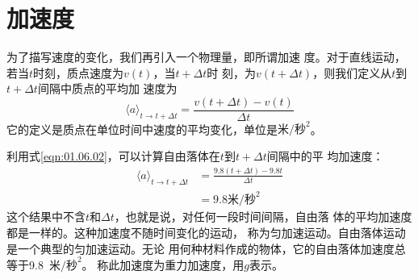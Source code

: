 \section{加速度}\label{sec:01.08}

为了描写速度的变化，我们再引入一个物理量，即所谓加速
度。对于直线运动，若当$t$时刻，质点速度为$v(t)$，$当t+\Delta t$时
刻，为$v(t+\Delta t)$，则我们定义从$t$到$t+\Delta t$间隔中质点的平均加
速度为
\vspace{-1em}\begin{equation}\label{eqn:01.08.01}
    \langle a\rangle_{t\rightarrow t+\Delta t} = \frac{v(t+\Delta t)-v(t)}{\Delta t}
\end{equation}
它的定义是质点在单位时间中速度的平均变化，单位是$\text{米/秒}^2$。

利用式\eqref{eqn:01.06.02}，可以计算自由落体在$t$到$t+\Delta t$间隔中的平
均加速度：
\vspace{-0.5em}\begin{equation*}
    \begin{aligned}
        \langle a\rangle_{t\rightarrow t+\Delta t} & = \frac{9.8(t+\Delta t)-9.8t}{\Delta t} \\
                                                   & = 9.8\text{米/秒}^2
    \end{aligned}
\end{equation*}
这个结果中不含$t$和$\Delta t$，也就是说，对任何一段时间间隔，自由落
体的平均加速度都是一样的。这种加速度不随时间变化的运动，
称为匀加速运动。自由落体运动是一个典型的匀加速运动。无论
用何种材料作成的物体，它的自由落体加速度总等于9.8~$\text{米/秒}^2$。
称此加速度为重力加速度，用$g$表示。

